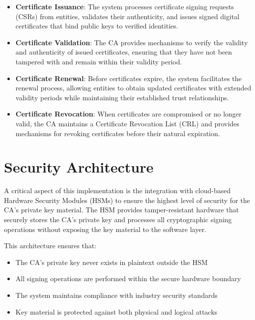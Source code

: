 \begin{itemize}
    \item \textbf{Certificate Issuance}: The system processes certificate signing requests (CSRs) from entities, validates their authenticity, and issues signed digital certificates that bind public keys to verified identities.
    
    \item \textbf{Certificate Validation}: The CA provides mechanisms to verify the validity and authenticity of issued certificates, ensuring that they have not been tampered with and remain within their validity period.
    
    \item \textbf{Certificate Renewal}: Before certificates expire, the system facilitates the renewal process, allowing entities to obtain updated certificates with extended validity periods while maintaining their established trust relationships.
    
    \item \textbf{Certificate Revocation}: When certificates are compromised or no longer valid, the CA maintains a Certificate Revocation List (CRL) and provides mechanisms for revoking certificates before their natural expiration.
\end{itemize}

\section{Security Architecture}

A critical aspect of this implementation is the integration with cloud-based Hardware Security Modules (HSMs) to ensure the highest level of security for the CA's private key material. The HSM provides tamper-resistant hardware that securely stores the CA's private key and processes all cryptographic signing operations without exposing the key material to the software layer.

This architecture ensures that:
\begin{itemize}
    \item The CA's private key never exists in plaintext outside the HSM
    \item All signing operations are performed within the secure hardware boundary
    \item The system maintains compliance with industry security standards
    \item Key material is protected against both physical and logical attacks
\end{itemize}

